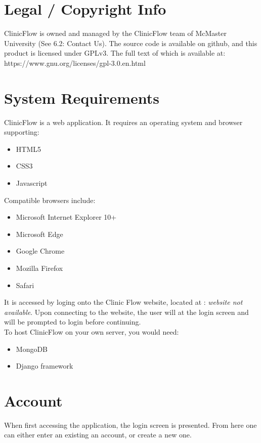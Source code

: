 \documentclass[12pt]{article}
\begin{document}
\section{Legal / Copyright Info}
ClinicFlow is owned and managed by the ClinicFlow team of McMaster University (See 6.2: Contact Us). The source code is available on github, and this product is licensed under GPLv3. The full text of which is available at:
\medbreak
https://www.gnu.org/licenses/gpl-3.0.en.html

\section{System Requirements}
ClinicFlow is a web application. It requires an operating system and browser supporting:
\begin{itemize}
\item HTML5
\item CSS3
\item Javascript
\end{itemize}
Compatible browsers include:
\begin{itemize}
\item Microsoft Internet Explorer 10+
\item Microsoft Edge
\item Google Chrome
\item Mozilla Firefox
\item Safari
\end{itemize}
It is accessed by loging onto the Clinic Flow website, located at : \textit{website not available}. Upon connecting to the website, the user will at the login screen and will be prompted to login before continuing. \\ \newline
To host ClinicFlow on your own server, you would need:
\begin{itemize}
\item MongoDB
\item Django framework
\end{itemize}

\section{Account}
When first accessing the application, the login screen is presented. From here one can either enter an existing an account, or create a new one. \\
\end{document}
